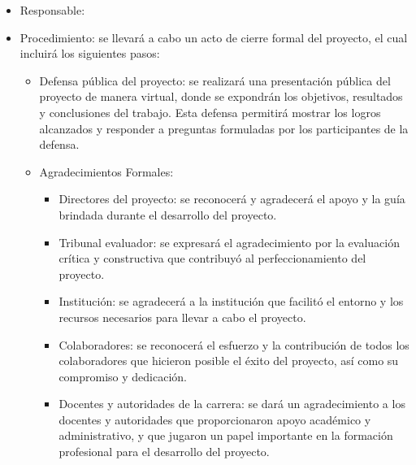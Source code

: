 \begin{itemize}
	      \begin{itemize}
		      \item Responsable: \authorname
		      \item Procedimiento: se llevará a cabo un acto de cierre formal del proyecto, el cual
		            incluirá los siguientes pasos:
		            \begin{itemize}
			            \item Defensa pública del proyecto: se realizará una presentación pública del
			                  proyecto de manera virtual, donde se expondrán los objetivos, resultados y
			                  conclusiones del trabajo. Esta defensa permitirá mostrar los logros alcanzados
			                  y responder a preguntas formuladas por los participantes de la defensa.
			            \item Agradecimientos Formales:
			                  \begin{itemize}
				                  \item Directores del proyecto: se reconocerá y agradecerá el apoyo y la guía brindada
				                        durante el desarrollo del proyecto.
				                  \item Tribunal evaluador: se expresará el agradecimiento por la evaluación crítica y
				                        constructiva que contribuyó al perfeccionamiento del proyecto.
				                  \item Institución: se agradecerá a la institución que facilitó el entorno y los
				                        recursos necesarios para llevar a cabo el proyecto.
				                  \item Colaboradores: se reconocerá el esfuerzo y la contribución de todos los
				                        colaboradores que hicieron posible el éxito del proyecto, así como su
				                        compromiso y dedicación.
				                  \item Docentes y autoridades de la carrera: se dará un agradecimiento a los docentes
				                        y autoridades que proporcionaron apoyo académico y administrativo, y que
				                        jugaron un papel importante en la formación profesional para el desarrollo del
				                        proyecto.
			                  \end{itemize}
		            \end{itemize}
	      \end{itemize}
\end{itemize}